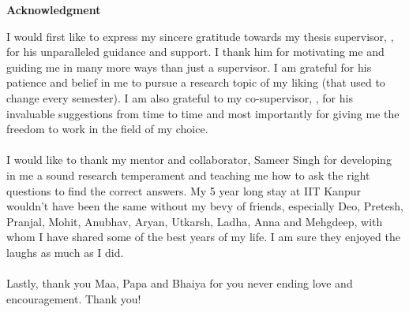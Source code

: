 \begin{center}
	{\huge{\textbf{Acknowledgment}}}
\end{center}
I would first like to express my sincere gratitude towards my thesis supervisor, {\advisormain}, for his unparalleled guidance and support. I thank him for motivating me and guiding me in many more ways than just a supervisor. I am grateful for his patience and belief in me to pursue a research topic of my liking (that used to change every semester). I am also grateful to my co-supervisor, {\advisorsec}, for his invaluable suggestions from time to time and most importantly for giving me the freedom to work in the field of my choice.

\paragraph*{}
I would like to thank my mentor and collaborator, Sameer Singh for developing in me a sound research temperament and teaching me how to ask the right questions to find the correct answers. 
My 5 year long stay at IIT Kanpur wouldn't have been the same without my bevy of friends, especially Deo, Pretesh, Pranjal, Mohit, Anubhav, Aryan, Utkarsh, Ladha, Anna and Mehgdeep, with whom I have shared some of the best years of my life. I am sure they enjoyed the laughs as much as I did.

\paragraph*{}
Lastly, thank you Maa, Papa and Bhaiya for you never ending love and encouragement. Thank you!

\vskip 4mm
\begin{flushright}
\textit{\textbf{\author}}
\end{flushright}




